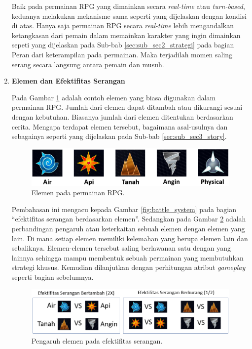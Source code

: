\begin{enumerate}[label=\textbf{\arabic*).}]
	Baik pada permainan RPG yang dimainkan secara \textit{real-time} atau \textit{turn-based}, keduanya melakukan mekanisme sama seperti yang dijelaskan dengan kondisi di atas. Hanya saja permainan RPG secara \textit{real-time} lebih mengandalkan ketangkasan dari pemain dalam memainkan karakter yang ingin dimainkan sepeti yang dijelaskan pada Sub-bab \ref{sec:sub_sec2_strategi} pada bagian Peran dari keterampilan pada permainan. Maka terjadilah momen saling serang secara langsung antara pemain dan musuh.
	
	\item \textbf{Elemen dan Efektifitas Serangan}
	
	Pada Gambar \ref{fig:elemen} adalah contoh elemen yang biasa digunakan dalam permainan RPG. Jumlah dari elemen dapat ditambah atau dikurangi sesuai dengan kebutuhan. Biasanya jumlah dari elemen ditentukan berdasarkan cerita. Mengapa terdapat elemen tersebut, bagaimana asal-usulnya dan sebagainya seperti yang dijelaskan pada Sub-bab \ref{sec:sub_sec3_story}.
	\vspace{1ex}
	
	\begin{figure} [!h] \centering
		\includegraphics[scale=0.40]{img/element.png}
		\caption{Elemen pada permainan RPG.}
		\label{fig:elemen}
	\end{figure}
	
	Pembahasan ini mengacu kepada Gambar \ref{fig:battle_system} pada bagian ``efektifitas serangan berdasarkan elemen''. Sedangkan pada Gambar \ref{fig:efektifitas} adalah perbandingan pengaruh atau keterkaitan sebuah elemen dengan elemen yang lain. Di mana setiap elemen memiliki kelemahan yang berupa elemen lain dan sebaliknya. Elemen-elemen tersebut saling berlawanan satu dengan yang lainnya sehingga mampu membentuk sebuah permainan yang membutuhkan strategi khusus. Kemudian dilanjutkan dengan perhitungan atribut \textit{gameplay} seperti bagian sebelumnya.
	\vspace{1ex}
	
	\begin{figure} [!h] \centering
		\includegraphics[scale=0.58]{img/efektifitas.png}
		\caption{Pengaruh elemen pada efektifitas serangan.}
		\label{fig:efektifitas}
	\end{figure}
	

\end{enumerate}
